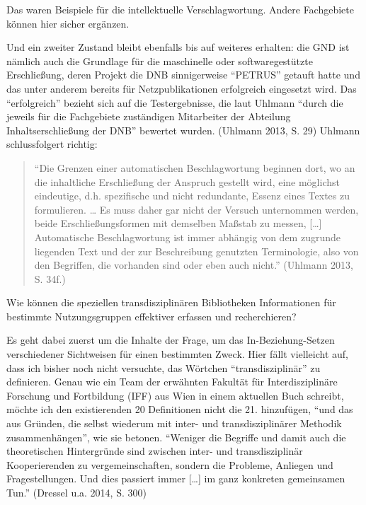 Das waren Beispiele für die intellektuelle Verschlagwortung. Andere
Fachgebiete können hier sicher ergänzen.

Und ein zweiter Zustand bleibt ebenfalls bis auf weiteres erhalten: die
GND ist nämlich auch die Grundlage für die maschinelle oder
softwaregestützte Erschließung, deren Projekt die DNB sinnigerweise
\enquote{PETRUS} getauft hatte und das unter anderem bereits für
Netzpublikationen erfolgreich eingesetzt wird. Das \enquote{erfolgreich}
bezieht sich auf die Testergebnisse, die laut Uhlmann \enquote{durch die
jeweils für die Fachgebiete zuständigen Mitarbeiter der Abteilung
Inhaltserschließung der DNB} bewertet wurden. (Uhlmann 2013, S. 29)
Uhlmann schlussfolgert richtig:

\begin{quote}
\enquote{Die Grenzen einer automatischen Beschlagwortung beginnen dort,
wo an die inhaltliche Erschließung der Anspruch gestellt wird, eine
möglichst eindeutige, d.h. spezifische und nicht redundante, Essenz
eines Textes zu formulieren. \ldots{} Es muss daher gar nicht der
Versuch unternommen werden, beide Erschließungsformen mit demselben
Maßstab zu messen, {[}\ldots{}{]} Automatische Beschlagwortung ist immer
abhängig von dem zugrunde liegenden Text und der zur Beschreibung
genutzten Terminologie, also von den Begriffen, die vorhanden sind oder
eben auch nicht.} (Uhlmann 2013, S. 34f.)
\end{quote}

Wie können die speziellen transdisziplinären Bibliotheken Informationen
für bestimmte Nutzungsgruppen effektiver erfassen und recherchieren?

Es geht dabei zuerst um die Inhalte der Frage, um das
In-Beziehung-Setzen verschiedener Sichtweisen für einen bestimmten
Zweck. Hier fällt vielleicht auf, dass ich bisher noch nicht versuchte,
das Wörtchen \enquote{transdisziplinär} zu definieren. Genau wie ein
Team der erwähnten Fakultät für Interdisziplinäre Forschung und
Fortbildung (IFF) aus Wien in einem aktuellen Buch schreibt, möchte ich
den existierenden 20 Definitionen nicht die 21. hinzufügen, \enquote{und
das aus Gründen, die selbst wiederum mit inter- und transdisziplinärer
Methodik zusammenhängen}, wie sie betonen. \enquote{Weniger die Begriffe
und damit auch die theoretischen Hintergründe sind zwischen inter- und
transdisziplinär Kooperierenden zu vergemeinschaften, sondern die
Probleme, Anliegen und Fragestellungen. Und dies passiert immer
{[}\ldots{}{]} im ganz konkreten gemeinsamen Tun.} (Dressel u.a. 2014,
S. 300)

